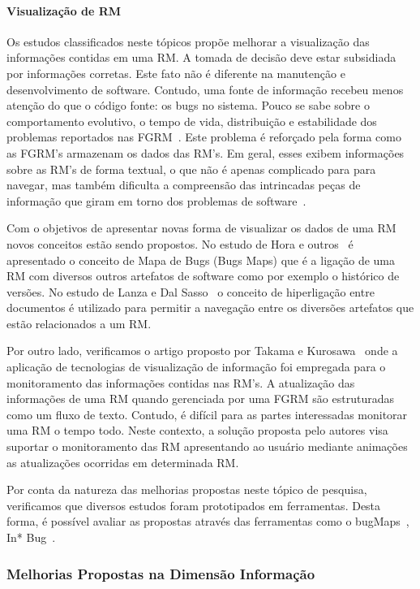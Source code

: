 \paragraph{Visualização de RM} Os estudos classificados neste tópicos propõe
melhorar a visualização das informações contidas em uma RM\@. A tomada de
decisão deve estar subsidiada por informações corretas. Este fato não é
diferente na manutenção e desenvolvimento de software. Contudo, uma fonte de
informação recebeu menos atenção do que o código fonte: os bugs no sistema.
Pouco se sabe sobre o comportamento evolutivo, o tempo de vida, distribuição e
estabilidade dos problemas reportados nas FGRM~\cite{hora2012bug}. Este problema
é reforçado pela forma como as FGRM's armazenam os dados das RM's. Em geral,
esses exibem informações sobre as RM's de forma textual, o que não é apenas
complicado para para navegar, mas também dificulta a compreensão das intrincadas
peças de informação que giram em torno dos problemas de
software~\cite{dal2014bug}.

Com o objetivos de apresentar novas forma de visualizar os dados de uma RM novos
conceitos estão sendo propostos. No estudo de Hora e outros~\cite{hora2012bug} é
apresentado o conceito de Mapa de Bugs (Bugs Maps) que é a ligação de uma RM com
diversos outros artefatos de software como por exemplo o histórico de versões.
No estudo de Lanza e  Dal Sasso~\cite{dal2014bug} o conceito de hiperligação
entre documentos é utilizado para permitir a navegação entre os diversões
artefatos que estão relacionados a um RM\@.

Por outro lado, verificamos o artigo proposto por Takama e
Kurosawa~\cite{takama2013application} onde a aplicação de tecnologias de
visualização de informação foi empregada para o monitoramento das informações
contidas nas RM's. A atualização das informações de uma RM quando gerenciada por
uma FGRM são estruturadas como um fluxo de texto. Contudo, é difícil para as
partes interessadas monitorar uma RM o tempo todo. Neste contexto, a solução
proposta pelo autores visa suportar o monitoramento das RM apresentando ao
usuário mediante animações as atualizações ocorridas em determinada RM\@.

Por conta da natureza das melhorias propostas neste tópico de pesquisa,
verificamos que diversos estudos foram prototipados em ferramentas. Desta forma,
é possível avaliar as propostas através das ferramentas como o
bugMaps~\cite{hora2012bug}, In* Bug~\cite{dal2014bug}.

\subsubsection{Melhorias Propostas na Dimensão Informação}
\label{ssub:melhorias_dim_informacao}

